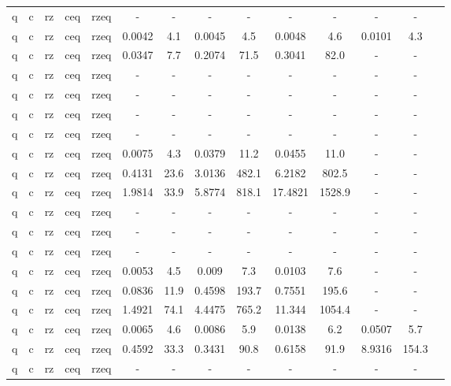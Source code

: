 \begin{table}[htb]
{\begin{tabular}{|c|c|c|c|c|c|c|c|c|c|c|c|c|c|}
q & c & rz & ceq & rzeq & - & - & - & - & - & - & - & - \\ 
q & c & rz & ceq & rzeq & 0.0042 & 4.1 & 0.0045 & 4.5 & 0.0048 & 4.6 & 0.0101 & 4.3 \\ 
q & c & rz & ceq & rzeq & 0.0347 & 7.7 & 0.2074 & 71.5 & 0.3041 & 82.0 & - & - \\ 
q & c & rz & ceq & rzeq & - & - & - & - & - & - & - & - \\ 
q & c & rz & ceq & rzeq & - & - & - & - & - & - & - & - \\ 
q & c & rz & ceq & rzeq & - & - & - & - & - & - & - & - \\ 
q & c & rz & ceq & rzeq & - & - & - & - & - & - & - & - \\ 
q & c & rz & ceq & rzeq & 0.0075 & 4.3 & 0.0379 & 11.2 & 0.0455 & 11.0 & - & - \\ 
q & c & rz & ceq & rzeq & 0.4131 & 23.6 & 3.0136 & 482.1 & 6.2182 & 802.5 & - & - \\ 
q & c & rz & ceq & rzeq & 1.9814 & 33.9 & 5.8774 & 818.1 & 17.4821 & 1528.9 & - & - \\ 
q & c & rz & ceq & rzeq & - & - & - & - & - & - & - & - \\ 
q & c & rz & ceq & rzeq & - & - & - & - & - & - & - & - \\ 
q & c & rz & ceq & rzeq & - & - & - & - & - & - & - & - \\ 
q & c & rz & ceq & rzeq & 0.0053 & 4.5 & 0.009 & 7.3 & 0.0103 & 7.6 & - & - \\ 
q & c & rz & ceq & rzeq & 0.0836 & 11.9 & 0.4598 & 193.7 & 0.7551 & 195.6 & - & - \\ 
q & c & rz & ceq & rzeq & 1.4921 & 74.1 & 4.4475 & 765.2 & 11.344 & 1054.4 & - & - \\ 
q & c & rz & ceq & rzeq & 0.0065 & 4.6 & 0.0086 & 5.9 & 0.0138 & 6.2 & 0.0507 & 5.7 \\ 
q & c & rz & ceq & rzeq & 0.4592 & 33.3 & 0.3431 & 90.8 & 0.6158 & 91.9 & 8.9316 & 154.3 \\ 
q & c & rz & ceq & rzeq & - & - & - & - & - & - & - & - \\ 
\hline 
\end{tabular}} 
\end{table} 
